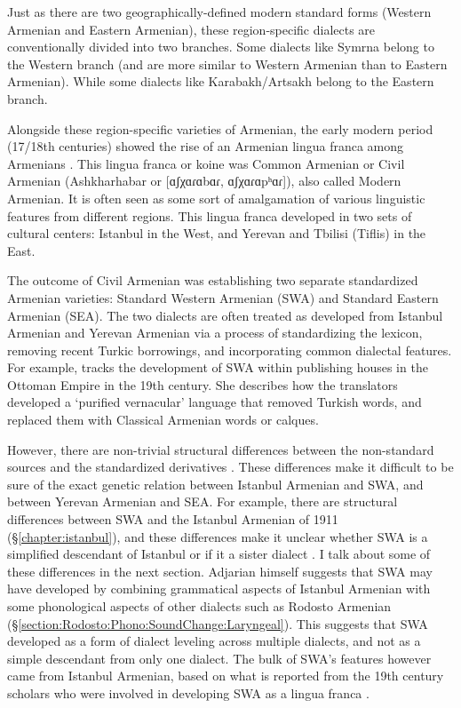 Just as there are two geographically-defined modern standard forms (Western Armenian and Eastern Armenian), these region-specific dialects are conventionally divided into two branches. Some dialects like Symrna belong to the Western branch (and are more similar to Western Armenian than to Eastern Armenian). While some dialects like Karabakh/Artsakh belong to the Eastern branch. 

Alongside these region-specific varieties of Armenian, the early modern period (17/18th centuries) showed the rise of an Armenian lingua franca among Armenians \citep{Parnassian-1985-FormationAshkharabar,Donabedian-2018-WestArmTypoSocio}. This lingua franca or koine was Common Armenian or Civil Armenian (Ashkharhabar or  [ɑʃχɑɾɑbɑɾ, ɑʃχɑɾɑpʰɑɾ]), also called Modern Armenian. It is often seen as some sort of amalgamation of various linguistic features from different regions. This lingua franca developed in two sets of cultural centers: Istanbul in the West, and Yerevan and Tbilisi (Tiflis) in the East. 

The outcome of Civil Armenian was establishing two separate standardized Armenian varieties: Standard Western Armenian (SWA) and Standard Eastern Armenian (SEA). The two dialects are often treated as developed from Istanbul Armenian and Yerevan Armenian via a process of standardizing the lexicon, removing recent Turkic borrowings, and incorporating common dialectal features. For example, \citet{Manoukian-2022-LiteraryTranslationExpansionOttomanArmenian,Manoukian-2023-DissSearchPurityOttomanArmenian} tracks the development of SWA within publishing houses in the Ottoman Empire in the 19th century. She describes how the translators developed a `purified vernacular' language that removed Turkish words, and replaced them with Classical Armenian words or calques. 

However, there are non-trivial structural differences between the non-standard sources and the standardized derivatives \citep{SayeedVaux-2017-EvolutionArmenian}. These differences make it difficult to be sure of the exact genetic relation between Istanbul Armenian and SWA, and between Yerevan Armenian and SEA. For example, there are structural differences between SWA and the Istanbul Armenian of 1911 (\S\ref{chapter:istanbul}), and these differences make it unclear whether SWA is a simplified descendant of Istanbul or if it a sister dialect  \citep[1148]{SayeedVaux-2017-EvolutionArmenian}. I talk about some of these differences in the next section. Adjarian himself suggests that SWA may have developed by combining grammatical aspects of Istanbul Armenian with some phonological aspects of other dialects such as Rodosto Armenian (\S\ref{section:Rodosto:Phono:SoundChange:Laryngeal}). This suggests that SWA developed as a form of dialect leveling across multiple dialects, and not as a simple descendant from only one dialect. The bulk of SWA's features however came from Istanbul Armenian, based on what is reported from the 19th century scholars who were involved in developing   SWA as a lingua franca \citep{Manoukian-2023-DissSearchPurityOttomanArmenian}.  

